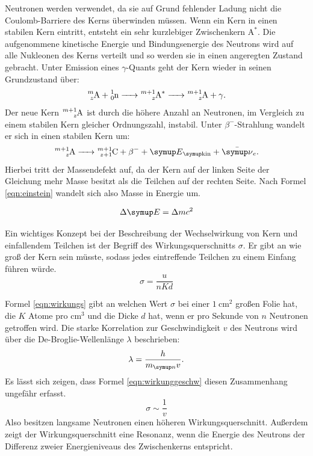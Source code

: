 Neutronen werden verwendet, da sie auf Grund fehlender Ladung nicht
die Coulomb-Barriere des Kerns überwinden müssen.
Wenn ein Kern in einen stabilen Kern eintritt, entsteht ein sehr kurzlebiger
Zwischenkern $\text{A}^*$. Die aufgenommene kinetische Energie und Bindungsenergie
des Neutrons wird auf alle Nukleonen des Kerns verteilt und so werden sie in
einen angeregten Zustand gebracht. Unter Emission eines $\gamma$-Quants
geht der Kern wieder in seinen Grundzustand über:
\begin{equation}
  \ce{^{m}_zA + ^1_0n -> ^{m+1}_zA^* -> ^{m+1}_zA + \gamma}.
\end{equation}
Der neue Kern $\ce{^{m+1}_zA}$ ist durch die höhere Anzahl an Neutronen, im Vergleich
zu einem stabilen Kern gleicher Ordnungszahl, instabil. Unter $\beta^-$-Strahlung
wandelt er sich in einen stabilen Kern um:
\begin{equation}
  \ce{^{m+1}_zA -> ^{m+1}_{z+1}C + \beta^- + \g{E}_{\g{kin}} + \bar{\g{\nu}}_e}.
\end{equation}
Hierbei tritt der Massendefekt auf, da der Kern auf der linken Seite der Gleichung
mehr Masse besitzt als die Teilchen auf der rechten Seite. Nach Formel \eqref{eqn:einstein}
wandelt sich also Masse in Energie um.

\begin{equation}
  \Delta\g{E} = \Delta m c^2
  \label{eqn:einstein}
\end{equation}

Ein wichtiges Konzept bei der Beschreibung der Wechselwirkung von Kern und
einfallendem Teilchen ist der Begriff des Wirkungsquerschnitts $\sigma$.
Er gibt an wie groß der Kern sein müsste, sodass jedes eintreffende Teilchen
zu einem Einfang führen würde.
\begin{equation}
  \sigma = \frac{u}{n K d}
  \label{eqn:wirkungs}
\end{equation}

Formel \eqref{eqn:wirkungs} gibt an welchen Wert $\sigma$ bei einer $\SI{1}{\centi\meter\squared}$
großen Folie hat, die $K$ Atome pro $\si{\centi\meter\tothe{3}}$ und die Dicke $d$ hat,
wenn er pro Sekunde von $n$ Neutronen getroffen wird. Die starke Korrelation
zur Geschwindigkeit $v$ des Neutrons wird über die De-Broglie-Wellenlänge $\lambda$
beschrieben:
\begin{equation}
  \lambda = \frac{h}{m_{\g{n}} v}.
\end{equation}
Es lässt sich zeigen, dass Formel \eqref{eqn:wirkunggeschw} diesen Zusammenhang
ungefähr erfasst.
\begin{equation}
  \sigma \sim \frac{1}{v}
  \label{eqn:wirkunggeschw}
\end{equation}
Also besitzen langsame Neutronen einen höheren Wirkungsquerschnitt.
Außerdem zeigt der Wirkungsquerschnitt eine Resonanz, wenn die Energie
des Neutrons der Differenz zweier Energieniveaus des Zwischenkerns entspricht.

